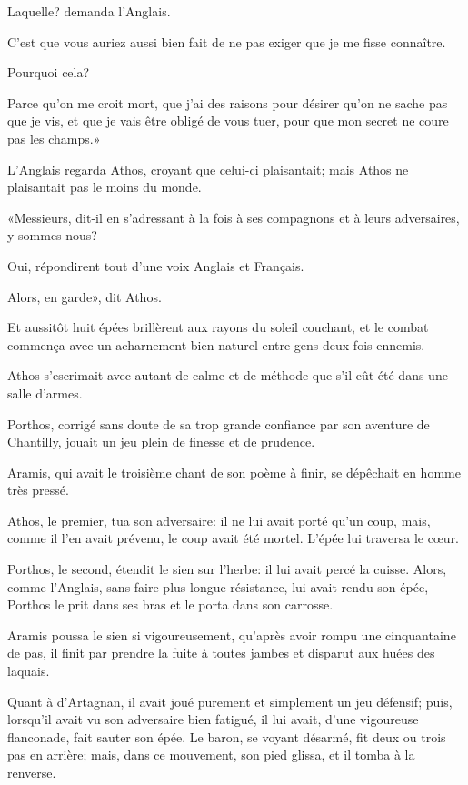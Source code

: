 \speak  Laquelle? demanda l'Anglais. 

\speak  C'est que vous auriez aussi bien fait de ne pas exiger que je me fisse connaître. 

\speak  Pourquoi cela? 

\speak  Parce qu'on me croit mort, que j'ai des raisons pour désirer qu'on ne sache pas que je vis, et que je vais être obligé de vous tuer, pour que mon secret ne coure pas les champs.» 

L'Anglais regarda Athos, croyant que celui-ci plaisantait; mais Athos ne plaisantait pas le moins du monde. 

«Messieurs, dit-il en s'adressant à la fois à ses compagnons et à leurs adversaires, y sommes-nous? 

\speak  Oui, répondirent tout d'une voix Anglais et Français. 

\speak  Alors, en garde», dit Athos. 

Et aussitôt huit épées brillèrent aux rayons du soleil couchant, et le combat commença avec un acharnement bien naturel entre gens deux fois ennemis. 

Athos s'escrimait avec autant de calme et de méthode que s'il eût été dans une salle d'armes. 

Porthos, corrigé sans doute de sa trop grande confiance par son aventure de Chantilly, jouait un jeu plein de finesse et de prudence. 

Aramis, qui avait le troisième chant de son poème à finir, se dépêchait en homme très pressé. 

Athos, le premier, tua son adversaire: il ne lui avait porté qu'un coup, mais, comme il l'en avait prévenu, le coup avait été mortel. L'épée lui traversa le cœur. 

Porthos, le second, étendit le sien sur l'herbe: il lui avait percé la cuisse. Alors, comme l'Anglais, sans faire plus longue résistance, lui avait rendu son épée, Porthos le prit dans ses bras et le porta dans son carrosse. 

Aramis poussa le sien si vigoureusement, qu'après avoir rompu une cinquantaine de pas, il finit par prendre la fuite à toutes jambes et disparut aux huées des laquais. 

Quant à d'Artagnan, il avait joué purement et simplement un jeu défensif; puis, lorsqu'il avait vu son adversaire bien fatigué, il lui avait, d'une vigoureuse flanconade, fait sauter son épée. Le baron, se voyant désarmé, fit deux ou trois pas en arrière; mais, dans ce mouvement, son pied glissa, et il tomba à la renverse. 

